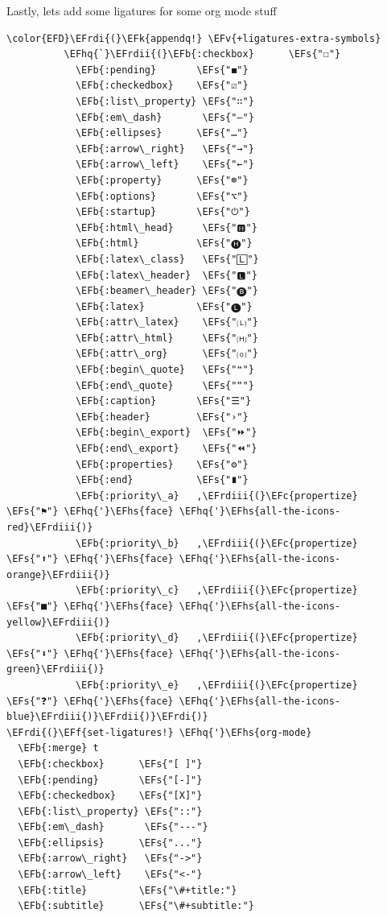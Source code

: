 \documentclass{scrartcl}
\newcommand{\EFk}[1]{\textcolor{EFk}{#1}} %
\newcommand{\EFs}[1]{\textcolor{EFs}{#1}} %
\newcommand{\EFb}[1]{\textcolor{EFb}{#1}} %
\newcommand{\EFc}[1]{\textcolor{EFc}{#1}} %
\newcommand{\EFv}[1]{\textcolor{EFv}{#1}} %
\newcommand{\EFf}[1]{\textcolor{EFf}{#1}} %
\newcommand{\EFhq}[1]{\textcolor{EFhq}{#1}} %
\newcommand{\EFhs}[1]{\textcolor{EFhs}{#1}} %
\newcommand{\EFrdi}[1]{\textcolor{EFrdi}{#1}} %
\newcommand{\EFrdii}[1]{\textcolor{EFrdii}{#1}} %
\newcommand{\EFrdiii}[1]{\textcolor{EFrdiii}{#1}} %
\begin{document}
Lastly, lets add some ligatures for some org mode stuff
\begin{Code}
\begin{Verbatim}[]
\color{EFD}\EFrdi{(}\EFk{appendq!} \EFv{+ligatures-extra-symbols}
          \EFhq{`}\EFrdii{(}\EFb{:checkbox}      \EFs{"☐"}
            \EFb{:pending}       \EFs{"◼"}
            \EFb{:checkedbox}    \EFs{"☑"}
            \EFb{:list\_property} \EFs{"∷"}
            \EFb{:em\_dash}       \EFs{"—"}
            \EFb{:ellipses}      \EFs{"…"}
            \EFb{:arrow\_right}   \EFs{"→"}
            \EFb{:arrow\_left}    \EFs{"←"}
            \EFb{:property}      \EFs{"☸"}
            \EFb{:options}       \EFs{"⌥"}
            \EFb{:startup}       \EFs{"⏻"}
            \EFb{:html\_head}     \EFs{"🅷"}
            \EFb{:html}          \EFs{"🅗"}
            \EFb{:latex\_class}   \EFs{"🄻"}
            \EFb{:latex\_header}  \EFs{"🅻"}
            \EFb{:beamer\_header} \EFs{"🅑"}
            \EFb{:latex}         \EFs{"🅛"}
            \EFb{:attr\_latex}    \EFs{"🄛"}
            \EFb{:attr\_html}     \EFs{"🄗"}
            \EFb{:attr\_org}      \EFs{"⒪"}
            \EFb{:begin\_quote}   \EFs{"❝"}
            \EFb{:end\_quote}     \EFs{"❞"}
            \EFb{:caption}       \EFs{"☰"}
            \EFb{:header}        \EFs{"›"}
            \EFb{:begin\_export}  \EFs{"⏩"}
            \EFb{:end\_export}    \EFs{"⏪"}
            \EFb{:properties}    \EFs{"⚙"}
            \EFb{:end}           \EFs{"∎"}
            \EFb{:priority\_a}   ,\EFrdiii{(}\EFc{propertize} \EFs{"⚑"} \EFhq{'}\EFhs{face} \EFhq{'}\EFhs{all-the-icons-red}\EFrdiii{)}
            \EFb{:priority\_b}   ,\EFrdiii{(}\EFc{propertize} \EFs{"⬆"} \EFhq{'}\EFhs{face} \EFhq{'}\EFhs{all-the-icons-orange}\EFrdiii{)}
            \EFb{:priority\_c}   ,\EFrdiii{(}\EFc{propertize} \EFs{"■"} \EFhq{'}\EFhs{face} \EFhq{'}\EFhs{all-the-icons-yellow}\EFrdiii{)}
            \EFb{:priority\_d}   ,\EFrdiii{(}\EFc{propertize} \EFs{"⬇"} \EFhq{'}\EFhs{face} \EFhq{'}\EFhs{all-the-icons-green}\EFrdiii{)}
            \EFb{:priority\_e}   ,\EFrdiii{(}\EFc{propertize} \EFs{"❓"} \EFhq{'}\EFhs{face} \EFhq{'}\EFhs{all-the-icons-blue}\EFrdiii{)}\EFrdii{)}\EFrdi{)}
\EFrdi{(}\EFf{set-ligatures!} \EFhq{'}\EFhs{org-mode}
  \EFb{:merge} t
  \EFb{:checkbox}      \EFs{"[ ]"}
  \EFb{:pending}       \EFs{"[-]"}
  \EFb{:checkedbox}    \EFs{"[X]"}
  \EFb{:list\_property} \EFs{"::"}
  \EFb{:em\_dash}       \EFs{"---"}
  \EFb{:ellipsis}      \EFs{"..."}
  \EFb{:arrow\_right}   \EFs{"->"}
  \EFb{:arrow\_left}    \EFs{"<-"}
  \EFb{:title}         \EFs{"\#+title:"}
  \EFb{:subtitle}      \EFs{"\#+subtitle:"}

\end{Verbatim}
\end{Code}
\end{document}
